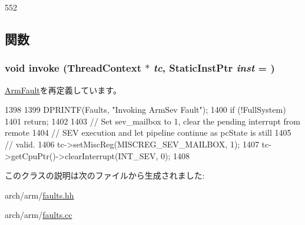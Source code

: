 \begin{DoxyCode}
552 {}
\end{DoxyCode}


\subsection{関数}
\hypertarget{classArmISA_1_1ArmSev_a2bd783b42262278d41157d428e1f8d6f}{
\subsubsection[{invoke}]{\setlength{\rightskip}{0pt plus 5cm}void invoke ({\bf ThreadContext} $\ast$ {\em tc}, \/  {\bf StaticInstPtr} {\em inst} = {})}}
\label{classArmISA_1_1ArmSev_a2bd783b42262278d41157d428e1f8d6f}


\hyperlink{classArmISA_1_1ArmFault_a2bd783b42262278d41157d428e1f8d6f}{ArmFault}を再定義しています。


\begin{DoxyCode}
1398                                                     {
1399     DPRINTF(Faults, "Invoking ArmSev Fault\n");
1400     if (!FullSystem)
1401         return;
1402 
1403     // Set sev_mailbox to 1, clear the pending interrupt from remote
1404     // SEV execution and let pipeline continue as pcState is still
1405     // valid.
1406     tc->setMiscReg(MISCREG_SEV_MAILBOX, 1);
1407     tc->getCpuPtr()->clearInterrupt(INT_SEV, 0);
1408 }
\end{DoxyCode}


このクラスの説明は次のファイルから生成されました:\begin{DoxyCompactItemize}
\item 
arch/arm/\hyperlink{arch_2arm_2faults_8hh}{faults.hh}\item 
arch/arm/\hyperlink{arch_2arm_2faults_8cc}{faults.cc}\end{DoxyCompactItemize}
